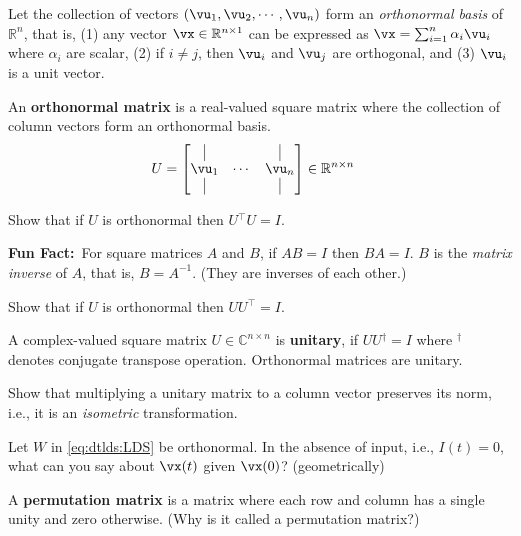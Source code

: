 \documentclass[a4paper,11pt]{exam}
\newcounter{ct}
\newcommand{\inv}{^{-1}}
\newcommand{\trp}{{^\top}} %
\newcommand{\ctrp}{{^\dagger}} %
\newcommand{\field}[1]{\ensuremath{\mathbb{#1}}}
\newcommand{\reals}{\field{R}}
\newcommand{\complex}{\field{C}}
\newcommand{\funfact}{\textbf{Fun Fact:}~}
\begin{document}
\begin{questions}
Let the collection of vectors $(\vu_1, \vu_2, \cdots, \vu_n)$ form an \textit{orthonormal basis} of $\reals^n$, that is,
(1) any vector $\vx \in \reals^{n \times 1}$ can be expressed as $\vx = \sum_{i=1}^n \alpha_i \vu_i$ where $\alpha_i$ are scalar,
(2) if $i \neq j$, then $\vu_i$ and $\vu_j$ are orthogonal,
and
(3) $\vu_i$ is a unit vector.

An \textbf{orthonormal matrix} is a real-valued square matrix where the collection of column vectors form an orthonormal basis.
\begin{align}\label{eq:LA:orthonormal}
U &=
    \begin{bmatrix}
	\kern.3em\vline\kern.3em
	&
	&
	\kern.3em\vline\kern.3em
	\\
	\vu_1 & \cdots & \vu_n \\
	\kern.3em\vline\kern.3em
	&
	&
	\kern.3em\vline\kern.3em
    \end{bmatrix}
    \in \reals^{n \times n}
\end{align}

\clearpage
\question Show that if $U$ is orthonormal then $U\trp U = I$.

\begin{tcolorbox}
    \funfact For square matrices $A$ and $B$, if $AB=I$ then $BA=I$.
    $B$ is the \textit{matrix inverse} of $A$, that is, $B = A\inv$.
    (They are inverses of each other.)
\end{tcolorbox}
\question Show that if $U$ is orthonormal then $U U\trp = I$.

A complex-valued square matrix $U \in \complex^{n \times n}$ is \textbf{unitary}, if $U U\ctrp = I$ where $\ctrp$ denotes conjugate transpose operation.
Orthonormal matrices are unitary.

\question Show that multiplying a unitary matrix to a column vector preserves its norm, i.e., it is an \emph{isometric} transformation.

\question Let $W$ in \eqref{eq:dtlds:LDS} be orthonormal. In the absence of input, i.e., $I(t) = 0$, what can you say about $\vx(t)$ given $\vx(0)$? (geometrically)

A \textbf{permutation matrix} is a matrix where each row and column has a single unity and zero otherwise. (Why is it called a permutation matrix?)


\end{questions}
\end{document}
